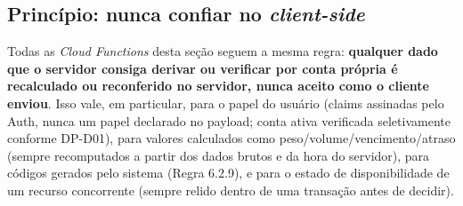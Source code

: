 \subsection{Princípio: nunca confiar no \textit{client-side}}
Todas as \textit{Cloud Functions} desta seção seguem a mesma regra: \textbf{qualquer dado que o servidor consiga derivar ou verificar por conta própria é recalculado ou reconferido no servidor, nunca aceito como o cliente enviou}. Isso vale, em particular, para o papel do usuário (claims assinadas pelo Auth, nunca um papel declarado no payload; conta ativa verificada seletivamente conforme DP-D01), para valores calculados como peso/volume/vencimento/atraso (sempre recomputados a partir dos dados brutos e da hora do servidor), para códigos gerados pelo sistema (Regra 6.2.9), e para o estado de disponibilidade de um recurso concorrente (sempre relido dentro de uma transação antes de decidir).

